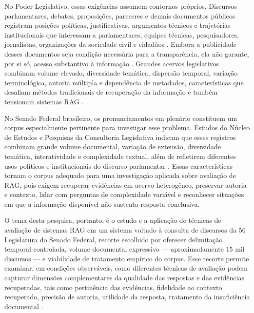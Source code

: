 No Poder Legislativo, essas exigências assumem contornos próprios. Discursos parlamentares, debates, proposições, pareceres e demais documentos públicos registram posições políticas, justificativas, argumentos técnicos e trajetórias institucionais que interessam a parlamentares, equipes técnicas, pesquisadores, jornalistas, organizações da sociedade civil e cidadãos \parencite{geunis2023parliamentaryMonitoring,skubicFiser2024discourseReview}. Embora a publicidade desses documentos seja condição necessária para a transparência, ela não garante, por si só, acesso substantivo à informação \parencite{bandeiraBernardes2016information}. Grandes acervos legislativos combinam volume elevado, diversidade temática, dispersão temporal, variação terminológica, autoria múltipla e dependência de metadados, características que desafiam métodos tradicionais de recuperação da informação e também tensionam sistemas RAG \parencite{manningEtAl2008informationRetrieval,skubicFiser2024discourseReview,martelloteViola2025organizacaoConhecimento}.

No Senado Federal brasileiro, os pronunciamentos em plenário constituem um corpus especialmente pertinente para investigar esse problema. Estudos do Núcleo de Estudos e Pesquisas da Consultoria Legislativa indicam que esses registros combinam grande volume documental, variação de extensão, diversidade temática, interatividade e complexidade textual, além de refletirem diferentes usos políticos e institucionais do discurso parlamentar \parencite{blanco2025plenarioPalanqueEstudio,blanco2026letrasGraudas}. Essas características tornam o corpus adequado para uma investigação aplicada sobre avaliação de RAG, pois exigem recuperar evidências em acervo heterogêneo, preservar autoria e contexto, lidar com perguntas de complexidade variável e reconhecer situações em que a informação disponível não sustenta resposta conclusiva.

O tema desta pesquisa, portanto, é o estudo e a aplicação de técnicas de avaliação de sistemas RAG em um sistema voltado à consulta de discursos da 56\textordfeminine{} Legislatura do Senado Federal, recorte escolhido por oferecer delimitação temporal controlada, volume documental expressivo --- aproximadamente 15 mil discursos --- e viabilidade de tratamento empírico do corpus. Esse recorte permite examinar, em condições observáveis, como diferentes técnicas de avaliação podem capturar dimensões complementares da qualidade das respostas e das evidências recuperadas, tais como pertinência das evidências, fidelidade ao contexto recuperado, precisão de autoria, utilidade da resposta, tratamento da insuficiência documental \parencite{esEtAl2023ragas,saadFalconEtAl2024ares,pipitoneAlami2024legalbenchRag}.

